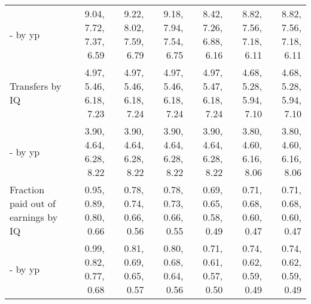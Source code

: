 \begin{tabular}{lrrrrrr}
- by yp & 9.04, 7.72, 7.37, 6.59  & 9.22, 8.02, 7.59, 6.79  & 9.18, 7.94, 7.54, 6.75  & 8.42, 7.26, 6.88, 6.16  & 8.82, 7.56, 7.18, 6.11  & 8.82, 7.56, 7.18, 6.11  \\ 
Transfers by IQ & 4.97, 5.46, 6.18, 7.23  & 4.97, 5.46, 6.18, 7.24  & 4.97, 5.46, 6.18, 7.24  & 4.97, 5.47, 6.18, 7.24  & 4.68, 5.28, 5.94, 7.10  & 4.68, 5.28, 5.94, 7.10  \\ 
- by yp & 3.90, 4.64, 6.28, 8.22  & 3.90, 4.64, 6.28, 8.22  & 3.90, 4.64, 6.28, 8.22  & 3.90, 4.64, 6.28, 8.22  & 3.80, 4.60, 6.16, 8.06  & 3.80, 4.60, 6.16, 8.06  \\ 
Fraction paid out of earnings by IQ & 0.95, 0.89, 0.80, 0.66  & 0.78, 0.74, 0.66, 0.56  & 0.78, 0.73, 0.66, 0.55  & 0.69, 0.65, 0.58, 0.49  & 0.71, 0.68, 0.60, 0.47  & 0.71, 0.68, 0.60, 0.47  \\ 
- by yp & 0.99, 0.82, 0.77, 0.68  & 0.81, 0.69, 0.65, 0.57  & 0.80, 0.68, 0.64, 0.56  & 0.71, 0.61, 0.57, 0.50  & 0.74, 0.62, 0.59, 0.49  & 0.74, 0.62, 0.59, 0.49  \\ 
\hline
\end{tabular}%

